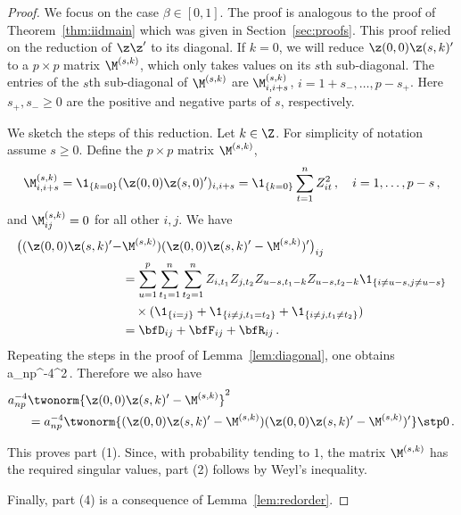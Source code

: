 \begin{proof}
We focus on the case $\beta \in [0,1]$.  The proof is analogous to the proof of
Theorem~\ref{thm:iidmain} which was given in Section~\ref{sec:proofs}. This proof relied on the reduction of $\z\z'$ to its diagonal. If $k=0$, we will reduce $\z(0,0)\z(s,k)'$ to 
 a $p\times p$ matrix $\M^{(s,k)}$, which only takes values on its $s$th sub-diagonal.
The entries of the $s$th sub-diagonal of $\M^{(s,k)}$ are $\M^{(s,k)}_{i,i+s}$, $i=1+s_-,\ldots,p-s_+$. Here $s_+, s_-\ge 0$ are the positive and negative parts of $s$, respectively.


We sketch the steps of this reduction. Let $k\in\Z$. For simplicity of notation assume $s \ge 0$.
Define the $p\times p$ matrix $\M^{(s,k)}$,
\begin{equation*}
\M^{(s,k)}_{i,i+s}=\1_{\{ k=0\}}(\z(0,0)\z(s,0)')_{i,i+s}= \1_{\{ k=0\}}\sum_{t=1}^n Z_{it}^2\,, \quad i=1,\ldots,p-s\,,
\end{equation*}
and $\M^{(s,k)}_{ij}=0$ for all other $i,j$. We have
\begin{equation*}
\begin{split}
\big((\z(0,0)\z(s,k)'-&\M^{(s,k)}) (\z(0,0)\z(s,k)'-\M^{(s,k)})'\big)_{ij}\\&=
\sum_{u=1}^p \sum_{t_1=1}^n \sum_{t_2=1}^n Z_{i,t_1} Z_{j,t_2} Z_{u-s,t_1-k}Z_{u-s,t_2-k} \1_{\{ i\neq u-s, j\neq u-s \}}\\
&\quad \times (\1_{\{ i=j\}}+\1_{\{i\neq j, t_1=t_2\}}+\1_{\{i\neq j, t_1\neq t_2\}})\\
&= \bfD_{ij}+\bfF_{ij}+\bfR_{ij}\,.
\end{split}
\end{equation*}
Repeating the steps in the proof of Lemma~\ref{lem:diagonal}, one obtains 
\beao
a_{np}^{-4}\twonorm{\bfD+\bfF+\bfR}^2\,.
\eeao
Therefore we also have
\begin{equation*}
\begin{split}
a_{np}^{-4}&\twonorm{\z(0,0)\z(s,k)'-\M^{(s,k)}}^2\\ &= 
a_{np}^{-4}\twonorm{(\z(0,0)\z(s,k)'-\M^{(s,k)}) (\z(0,0)\z(s,k)'-\M^{(s,k)})'}\stp 0\,.
\end{split}
\end{equation*}

This proves part (1). Since, with probability tending to $1$, the matrix $\M^{(s,k)}$ has the required singular values, part (2) follows by Weyl's inequality.  

Finally, part (4) is a consequence of Lemma~\ref{lem:redorder}.
\end{proof}
